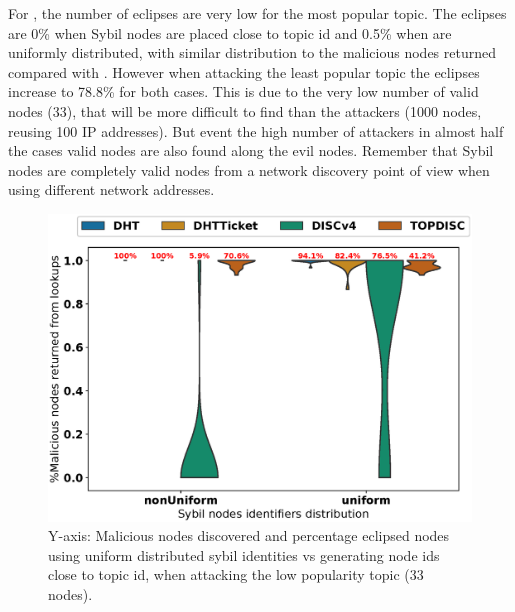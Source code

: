 For \sysname, the number of eclipses are very low for the most popular topic. 
The eclipses are 0\% when Sybil nodes are placed close to topic id and 0.5\% when are uniformly distributed, with similar distribution to the malicious nodes returned compared with \discv.
However when attacking the least popular topic the eclipses increase to 78.8\% for both cases.
This is due to the very low number of valid nodes (33),  that will be more difficult to find than the attackers (1000 nodes, reusing 100 IP addresses).  
But event the high number of attackers in almost half the cases valid nodes are also found along the evil nodes.
Remember that Sybil nodes are completely valid nodes from a network discovery point of view when using different network addresses.

\begin{figure}[!h]
\includegraphics[width=\linewidth]{results/security/violin_idDistribution_percentageMaliciousDiscovered_t299.eps}
\caption{Y-axis: Malicious nodes discovered and percentage eclipsed nodes using uniform distributed sybil identities vs generating node ids close to topic id,   when attacking the low popularity topic (33 nodes).}
\label{fig:eclipse_distribution_t299}
\end{figure}

